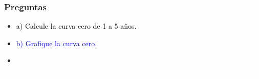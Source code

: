 \documentclass{beamer}
\begin{document}
\begin{frame}
  \frametitle{Preguntas}
  \begin{itemize}
    \item {\textcolor{black}{a) Calcule la curva cero de 1 a 5 años.}}
    \vspace{3pt}
    \item {\LARGE\textcolor{blue}{b) Grafique la curva cero.}}
    \vspace{3pt}
    \item {\textcolor{white}{c) Comente la probabilidad de default aproximada usando el 
    \textit{spread} BCP5$-$BCP1 y la tabla de Estrella \& Mishkin (1996).}}
    \vspace{3pt}
  \end{itemize}
\end{frame}
\end{document}
